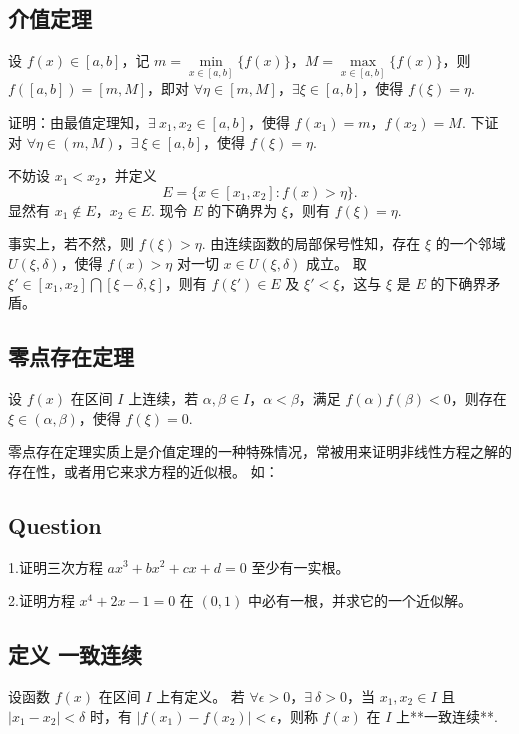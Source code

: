 \subsection{介值定理}\label{sub_conff_4}

  设 $f(x)\in [a,b]$，记 $m=\min\limits_{x\in[a,b]}\{f(x)\}$，$M=\max\limits_{x\in[a,b]}\{f(x)\}$，则 $f([a,b])=[m,M]$，即对 $\forall \eta\in[m,M]$，$\exists \xi\in[a,b]$，使得 $f(\xi)=\eta$.

  证明：由最值定理知，$\exists\ x_1,x_2\in[a,b]$，使得 $f(x_1)=m$，$f(x_2)=M$. 下证对 $\forall \eta\in (m,M)$，$\exists\  \xi\in[a,b]$，使得 $f(\xi)=\eta$.

  不妨设 $x_1<x_2$，并定义
  $$
  E=\{x\in[x_1,x_2]:f(x)>\eta\}.
  $$
  显然有 $x_1\notin E$，$x_2\in E$. 现令 $E$ 的下确界为 $\xi$，则有 $f(\xi)=\eta$.

  事实上，若不然，则 $f(\xi)>\eta$. 由连续函数的局部保号性知，存在 $\xi$ 的一个邻域 $U(\xi,\delta)$，使得 $f(x)>\eta$ 对一切 $x\in U(\xi,\delta)$ 成立。 取 $\xi'\in[x_1,x_2]\bigcap [\xi-\delta,\xi]$，则有 $f(\xi')\in E$ 及 $\xi'<\xi$，这与 $\xi$ 是 $E$ 的下确界矛盾。

\subsection{零点存在定理}

  设 $f(x)$ 在区间 $I$ 上连续，若 $\alpha,\beta\in I$，$\alpha<\beta$，满足 $f(\alpha)f(\beta)<0$，则存在 $\xi\in(\alpha,\beta)$，使得 $f(\xi)=0$.

  零点存在定理实质上是介值定理的一种特殊情况，常被用来证明非线性方程之解的存在性，或者用它来求方程的近似根。 如：

\subsection{Question}

  1.证明三次方程 $ax^3+bx^2+cx+d=0$ 至少有一实根。

  2.证明方程 $x^4+2x-1=0$ 在 $(0,1)$ 中必有一根，并求它的一个近似解。

\subsection{定义  一致连续}\label{sub_conff_2}

  设函数 $f(x)$ 在区间 $I$ 上有定义。  若 $\forall \epsilon>0$，$\exists\ \delta>0$，当 $x_1,x_2\in I$ 且 $\vert x_1-x_2\vert<\delta$ 时，有 $\vert f(x_1)-f(x_2)\vert<\epsilon$，则称 $f(x)$ 在 $I$ 上**一致连续**. 

